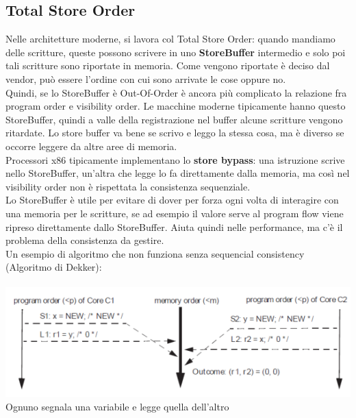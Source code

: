 \documentclass[12pt, oneside]{extbook}
\begin{document}
\subsection{Total Store Order}
Nelle architetture moderne, si lavora col Total Store Order: quando mandiamo delle scritture, queste possono scrivere in uno \textbf{StoreBuffer} intermedio e solo poi tali scritture sono riportate in memoria. Come vengono riportate è deciso dal vendor, può essere l'ordine con cui sono arrivate le cose oppure no.\\ Quindi, se lo StoreBuffer è Out-Of-Order è ancora più complicato la relazione fra program order e visibility order. Le macchine moderne tipicamente hanno questo StoreBuffer, quindi a valle della registrazione nel buffer alcune scritture vengono ritardate. Lo store buffer va bene se scrivo e leggo la stessa cosa, ma è diverso se occorre leggere da altre aree di memoria. \\ Processori x86 tipicamente implementano lo \textbf{store bypass}: una istruzione scrive nello StoreBuffer, un'altra che legge lo fa direttamente dalla memoria, ma così nel visibility order non è rispettata la consistenza sequenziale.\\ Lo StoreBuffer è utile per evitare di dover per forza ogni volta di interagire con una memoria per le scritture, se ad esempio il valore serve al program flow viene ripreso direttamente dallo StoreBuffer. Aiuta quindi nelle performance, ma c'è il problema della consistenza da gestire.\\ Un esempio di algoritmo che non funziona senza sequencial consistency (Algoritmo di Dekker):\\\\
\includegraphics[scale=0.5]{immagini/dekker}
\\ Ognuno segnala una variabile e legge quella dell'altro
\end{document}
